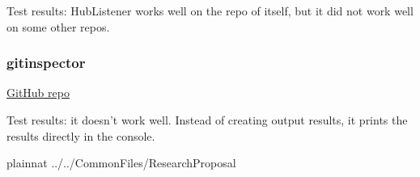 \documentclass[letterpaper,cleveref]{lipics-v2019}
\theoremstyle{definition}
\begin{document}
Test results: HubListener works well on the repo of itself, but it did not work
well on some other repos.

\subsubsection{gitinspector}
\href{https://github.com/ejwa/gitinspector}{GitHub repo}

Test results: it doesn't work well. Instead of creating output results, it
prints the results directly in the console.





\newpage

 {plainnat}
 {../../CommonFiles/ResearchProposal}
\end{document}
